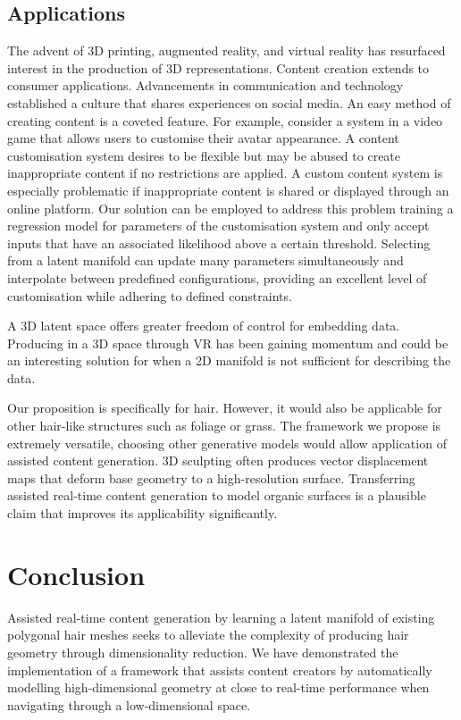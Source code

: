\documentclass[ %
author={Dillon Keith Diep},
supervisor={Dr. Carl Henrik Ek},
degree={MEng},
title={ART-CG Hair:},
subtitle={Assisted Real-time Content Generation of Stylised Virtual Hair},
type={Research},
year={2017} ]{dissertation}
\begin{document}
\section{Applications}
The advent of 3D printing, augmented reality, and virtual reality has resurfaced interest in the production of 3D representations. Content creation extends to consumer applications. Advancements in communication and technology established a culture that shares experiences on social media. An easy method of creating content is a coveted feature.
For example, consider a system in a video game that allows users to customise their avatar appearance. A content customisation system desires to be flexible but may be abused to create inappropriate content if no restrictions are applied. A custom content system is especially problematic if inappropriate content is shared or displayed through an online platform. Our solution can be employed to address this problem training a regression model for parameters of the customisation system and only accept inputs that have an associated likelihood above a certain threshold. Selecting from a latent manifold can update many parameters simultaneously and interpolate between predefined configurations, providing an excellent level of customisation while adhering to defined constraints.

A 3D latent space offers greater freedom of control for embedding data. Producing in a 3D space through VR has been gaining momentum and could be an interesting solution for when a 2D manifold is not sufficient for describing the data.

Our proposition is specifically for hair. However, it would also be applicable for other hair-like structures such as foliage or grass. The framework we propose is extremely versatile, choosing other generative models would allow application of assisted content generation. 3D sculpting often produces vector displacement maps that deform base geometry to a high-resolution surface. Transferring assisted real-time content generation to model organic surfaces is a plausible claim that improves its applicability significantly.


\chapter{Conclusion}
\label{chap:conclusion}
Assisted real-time content generation by learning a latent manifold of existing polygonal hair meshes seeks to alleviate the complexity of producing hair geometry through dimensionality reduction.
We have demonstrated the implementation of a framework that assists content creators by automatically modelling high-dimensional geometry at close to real-time performance when navigating through a low-dimensional space.
\end{document}
